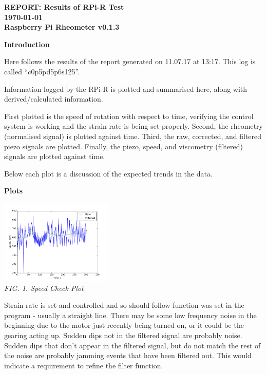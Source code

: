 \documentclass{article}
\begin{document}
	
	\twocolumn {}
	
	{\centering\Large\bfseries REPORT: \normalfont Results of RPi-R Test\\ \normalsize\today \\ Raspberry Pi Rheometer v0.1.3\\}
	
	\vskip0.5cm \noindent
	{\centering\textbf{Introduction}\\}
	
	Here follows the results of the report generated on 11.07.17 at 13:17. This log is called ``c0p5pd5p6s125''.
	
	Information logged by the RPi-R is plotted and summarised here, along with derived/calculated information.
	
	First plotted is the speed of rotation with respect to time, verifying the control system is working and the strain rate is being set properly. Second, the rheometry (normalised signal) is plotted against time. Third, the raw, corrected, and filtered piezo signals are plotted. Finally, the piezo, speed, and viscometry (filtered) signals are plotted against time.
	
	Below each plot is a discussion of the expected trends in the data.
	
	\vskip0.25cm \noindent
	{\centering\textbf{Plots}\\}
	
	{\centering \includegraphics[width=0.4\textwidth]{strain_check.png}\\
	\textit{FIG. 1. Speed Check Plot}\\}

	Strain rate is set and controlled and so should follow function was set in the program - usually a straight line. There may be some low frequency noise in the beginning due to the motor just recently being turned on, or it could be the gearing acting up. Sudden dips not in the filtered signal are probably noise. Sudden dips that don't appear in the filtered signal, but do not match the rest of the noise are probably jamming events that have been filtered out. This would indicate a requirement to refine the filter function.
\end{document}
